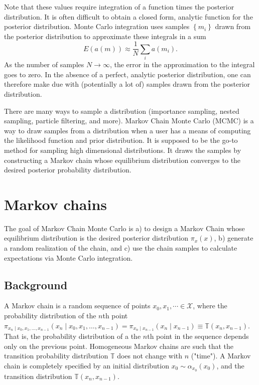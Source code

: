 \documentclass[11pt]{article}
\begin{document}
Note that these values require integration of a function times the posterior distribution. It is often difficult to obtain a closed form, analytic function for the posterior distribution. Monte Carlo integration uses samples $\left\{m_{i}\right\}$ drawn from the posterior distribution to approximate these integrals in a sum
\begin{equation}
E(a(m)) \approx \frac{1}{N} \sum_{i} a\left(m_{i}\right) .
\end{equation}
As the number of samples $N \rightarrow \infty$, the error in the approximation to the integral goes to zero. In the absence of a perfect, analytic posterior distribution, one can therefore make due with (potentially a lot of) samples drawn from the posterior distribution.

There are many ways to sample a distribution (importance sampling, nested sampling, particle filtering, and more). Markov Chain Monte Carlo (MCMC) is a way to draw samples from a distribution when a user has a means of computing the likelihood function and prior distribution. It is supposed to be the go-to method for sampling high dimensional distributions. It draws the samples by constructing a Markov chain whose equilibrium distribution converges to the desired posterior probability distribution.

\section{Markov chains}

The goal of Markov Chain Monte Carlo is a) to design a Markov Chain whose equilibrium distribution is the desired posterior distribution $\pi_{x}(x)$, b) generate a random realization of the chain, and c) use the chain samples to calculate expectations via Monte Carlo integration.

\subsection{Background}

A Markov chain is a random sequence of points $x_{0}, x_{1}, \cdots \in \mathcal{X}$, where the probability distribution of the $n$th point $\pi_{x_{n} \mid x_{0}, x_{1}, \ldots, x_{n-1}}\left(x_{n} \mid x_{0}, x_{1}, \ldots, x_{n-1}\right)=\pi_{x_{n} \mid x_{n-1}}\left(x_{n} \mid x_{n-1}\right) \equiv \mathbb{T}\left(x_{n}, x_{n-1}\right)$. That is, the probability distribution of a the $n$th point in the sequence depends only on the previous point. Homogeneous Markov chains are such that the transition probability distribution $\mathbb{T}$ does not change with $n$ ("time"). A Markov chain is completely specified by an initial distribution $x_{0} \sim \alpha_{x_{0}}\left(x_{0}\right)$, and the transition distribution $\mathbb{T}\left(x_{n}, x_{n-1}\right)$.
\end{document}
